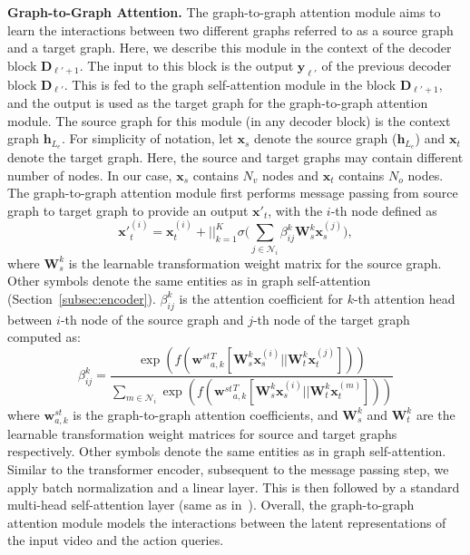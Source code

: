 \documentclass[10pt,twocolumn,letterpaper]{article}
\begin{document}
\vspace{0.05in}
\noindent
\textbf{Graph-to-Graph Attention.} The graph-to-graph attention module aims to learn the interactions between two different graphs referred to as a source graph and a target graph. 
Here, we describe this module in the context of the decoder block $\mathbf{D}_{\ell'+1}$.  
The input to this block is the output $\mathbf{y}_{\ell'}$ of the previous decoder block $\mathbf{D}_{\ell'}$.
This is fed to the graph self-attention module in the  block $\mathbf{D}_{\ell'+1}$, and the output is used as the target graph for the graph-to-graph attention module. 
The source graph for this module (in any decoder block) is the context graph $\mathbf{h}_{L_e}$.
For simplicity of notation, 
let $\mathbf{x}_{s}$ denote the source graph (\ie $\mathbf{h}_{L_e}$) and $\mathbf{x}_{t}$ denote the target graph. 
Here, the source and target graphs may contain different number of nodes. In our case, $\mathbf{x}_{s}$ contains $N_v$ nodes and $\mathbf{x}_{t}$ contains $N_o$ nodes.
The graph-to-graph attention module first performs message passing from source graph to target graph
to provide an output $\mathbf{x'}_{t}$, with the $i$-th node defined as
\begin{equation}
    \mathbf{x'}_{t}^{(i)} = \mathbf{x}_{t}^{(i)} + \Big| \Big|_{k=1} ^{K} \sigma \Big(\sum_{j \in \mathcal{N}_i} \beta_{ij}^{k} \mathbf{W}_{s}^k \mathbf{x}_{s}^{(j)}\Big),
\end{equation}
where $\mathbf{W}_{s}^{k}$ is the learnable transformation weight matrix for the source graph.
Other symbols denote the same entities as in graph self-attention (Section~\ref{subsec:encoder}).
$\beta_{ij}^{k}$ is the attention coefficient for $k$-th attention head between $i$-th node of the source graph and $j$-th node of the target graph computed as:
\begin{equation}
    \beta_{ij}^k = \frac{\exp (f(\mathbf{w}^{st}{_{a,k}^{T}} [\mathbf{W}_{s}^{k}\mathbf{x}_{s}^{(i)} || \mathbf{W}_{t}^{k}\mathbf{x}_{t}^{(j)}]))}{\sum_{m \in \mathcal{N}_i}\exp (f(\mathbf{w}^{st}{_{a,k}^T} [\mathbf{W}_{s}^{k}\mathbf{x}_{s}^{(i)} || \mathbf{W}_{t}^{k}\mathbf{x}_{t}^{(m)}]))}
\end{equation}
where $\mathbf{w}^{st}_{a,k}$ is the graph-to-graph attention coefficients, and
$\mathbf{W}_{s}^{k}$ and
$\mathbf{W}_{t}^{k}$ are the learnable transformation weight matrices for source and target graphs respectively. 
Other symbols denote the same entities as in graph self-attention.
Similar to the transformer encoder, subsequent to the message passing step, we apply batch normalization and a linear layer. This is then followed by a standard multi-head self-attention layer (same as in~\cite{vaswani2017attention}). 
Overall, the graph-to-graph attention module models the interactions between the latent representations of the input video and the action queries. 
\end{document}
